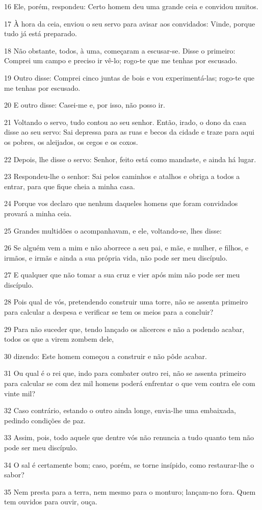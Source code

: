 \par 16 Ele, porém, respondeu: Certo homem deu uma grande ceia e convidou muitos.
\par 17 À hora da ceia, enviou o seu servo para avisar aos convidados: Vinde, porque tudo já está preparado.
\par 18 Não obstante, todos, à uma, começaram a escusar-se. Disse o primeiro: Comprei um campo e preciso ir vê-lo; rogo-te que me tenhas por escusado.
\par 19 Outro disse: Comprei cinco juntas de bois e vou experimentá-las; rogo-te que me tenhas por escusado.
\par 20 E outro disse: Casei-me e, por isso, não posso ir.
\par 21 Voltando o servo, tudo contou ao seu senhor. Então, irado, o dono da casa disse ao seu servo: Sai depressa para as ruas e becos da cidade e traze para aqui os pobres, os aleijados, os cegos e os coxos.
\par 22 Depois, lhe disse o servo: Senhor, feito está como mandaste, e ainda há lugar.
\par 23 Respondeu-lhe o senhor: Sai pelos caminhos e atalhos e obriga a todos a entrar, para que fique cheia a minha casa.
\par 24 Porque vos declaro que nenhum daqueles homens que foram convidados provará a minha ceia.
\par 25 Grandes multidões o acompanhavam, e ele, voltando-se, lhes disse:
\par 26 Se alguém vem a mim e não aborrece a seu pai, e mãe, e mulher, e filhos, e irmãos, e irmãs e ainda a sua própria vida, não pode ser meu discípulo.
\par 27 E qualquer que não tomar a sua cruz e vier após mim não pode ser meu discípulo.
\par 28 Pois qual de vós, pretendendo construir uma torre, não se assenta primeiro para calcular a despesa e verificar se tem os meios para a concluir?
\par 29 Para não suceder que, tendo lançado os alicerces e não a podendo acabar, todos os que a virem zombem dele,
\par 30 dizendo: Este homem começou a construir e não pôde acabar.
\par 31 Ou qual é o rei que, indo para combater outro rei, não se assenta primeiro para calcular se com dez mil homens poderá enfrentar o que vem contra ele com vinte mil?
\par 32 Caso contrário, estando o outro ainda longe, envia-lhe uma embaixada, pedindo condições de paz.
\par 33 Assim, pois, todo aquele que dentre vós não renuncia a tudo quanto tem não pode ser meu discípulo.
\par 34 O sal é certamente bom; caso, porém, se torne insípido, como restaurar-lhe o sabor?
\par 35 Nem presta para a terra, nem mesmo para o monturo; lançam-no fora. Quem tem ouvidos para ouvir, ouça.


